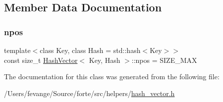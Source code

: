 \subsection{Member Data Documentation}
\mbox{\label{class_hash_vector_abf48a0c17475981e14aaa83fec37a1e8}} 
\subsubsection{\texorpdfstring{npos}{npos}}
{\footnotesize\ttfamily template$<$class Key, class Hash = std\+::hash$<$\+Key$>$$>$ \\
const size\+\_\+t \mbox{\hyperlink{class_hash_vector}{Hash\+Vector}}$<$ Key, Hash $>$\+::npos = S\+I\+Z\+E\+\_\+\+M\+AX\hspace{0.3cm}{\ttfamily [static]}}



The documentation for this class was generated from the following file\+:\begin{DoxyCompactItemize}
\item 
/\+Users/fevange/\+Source/forte/src/helpers/\mbox{\hyperlink{hash__vector_8h}{hash\+\_\+vector.\+h}}\end{DoxyCompactItemize}
